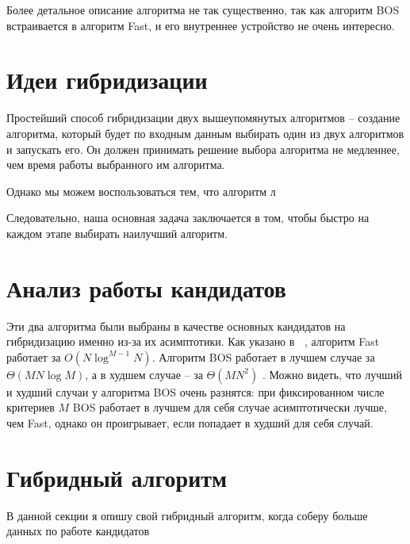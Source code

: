 Более детальное описание алгоритма не так существенно, так как алгоритм BOS встраивается в алгоритм Fast, и его внутреннее устройство не очень интересно. 

\section{Идеи гибридизации}
Простейший способ гибридизации двух вышеупомянутых алгоритмов -- создание алгоритма, который будет по входным данным выбирать один из двух алгоритмов и запускать его. Он должен принимать решение выбора алгоритма не медленнее, чем время работы выбранного им алгоритма.

Однако мы можем воспользоваться тем, что алгоритм л

Следовательно, наша основная задача заключается в том, чтобы быстро на каждом этапе выбирать наилучший алгоритм.  


\section{Анализ работы кандидатов}

Эти два алгоритма были выбраны в качестве основных кандидатов на гибридизацию именно из-за их асимптотики. Как указано в \cite{Buzdalov}, алгоритм Fast работает за $O(N\log^{M - 1}N)$. Алгоритм BOS работает в лучшем случае за $\Theta(MN\log{M})$, а в худшем случае -- за $\Theta(MN^2)$ \cite{BOS}. Можно видеть, что лучший и худший случаи у алгоритма BOS очень разнятся: при фиксированном числе критериев  $M$ BOS работает в лучшем для себя случае асимптотически лучше, чем Fast, однако он проигрывает, если попадает в худший для себя случай.

\section{Гибридный алгоритм}

В данной секции я опишу свой гибридный алгоритм, когда соберу больше данных по работе кандидатов